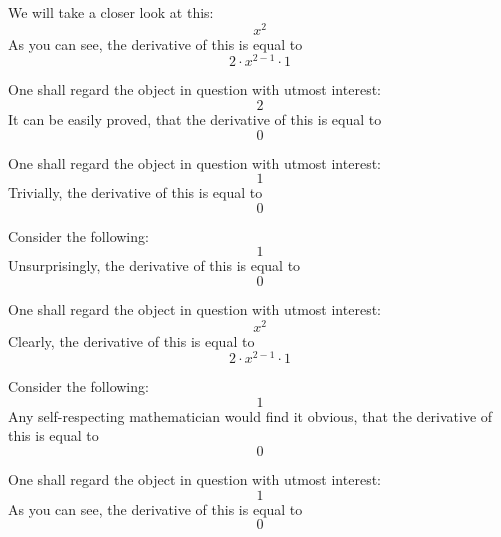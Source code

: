 \documentclass{article}
\begin{document}
We will take a closer look at this:
\begin{equation}
x ^{2 } 
\end{equation}
As you can see, the derivative of this is equal to
\begin{equation}
2 \cdot x ^{2 - 1 } \cdot 1 
\end{equation}

One shall regard the object in question with utmost interest:
\begin{equation}
2 
\end{equation}
It can be easily proved, that the derivative of this is equal to
\begin{equation}
0 
\end{equation}

One shall regard the object in question with utmost interest:
\begin{equation}
1 
\end{equation}
Trivially, the derivative of this is equal to
\begin{equation}
0 
\end{equation}

Consider the following:
\begin{equation}
1 
\end{equation}
Unsurprisingly, the derivative of this is equal to
\begin{equation}
0 
\end{equation}

One shall regard the object in question with utmost interest:
\begin{equation}
x ^{2 } 
\end{equation}
Clearly, the derivative of this is equal to
\begin{equation}
2 \cdot x ^{2 - 1 } \cdot 1 
\end{equation}

Consider the following:
\begin{equation}
1 
\end{equation}
Any self-respecting mathematician would find it obvious, that the derivative of this is equal to
\begin{equation}
0 
\end{equation}

One shall regard the object in question with utmost interest:
\begin{equation}
1 
\end{equation}
As you can see, the derivative of this is equal to
\begin{equation}
0 
\end{equation}
\end{document}
